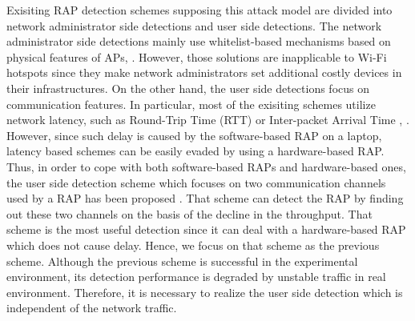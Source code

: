 \documentclass[conference]{IEEEtran}
\begin{document}
Exisiting RAP detection schemes supposing this attack model are divided into network administrator side detections and user side detections.
The network administrator side detections mainly use whitelist-based mechanisms based on physical features of APs\cite{prapd}, \cite{clockskew}.
However, those solutions are inapplicable to Wi-Fi hotspots since they make network administrators set additional costly devices in their infrastructures.
On the other hand, the user side detections focus on communication features.
In particular, most of the exisiting schemes utilize network latency, such as Round-Trip Time (RTT) or Inter-packet Arrival Time \cite{rtt}, \cite{iat}.
However, since such delay is caused by the software-based RAP on a laptop, latency based schemes can be easily evaded by using a hardware-based RAP.
Thus, in order to cope with both software-based RAPs and hardware-based ones, the user side detection scheme which focuses on two communication channels used by a RAP has been proposed \cite{previous}.
That scheme can detect the RAP by finding out these two channels on the basis of the decline in the throughput.
That scheme is the most useful detection since it can deal with a hardware-based RAP which does not cause delay.
Hence, we focus on that scheme \cite{previous} as the previous scheme.
Although the previous scheme is successful in the experimental environment, its detection performance is degraded by unstable traffic in real environment.
Therefore, it is necessary to realize the user side detection which is independent of the network traffic.
\end{document}

